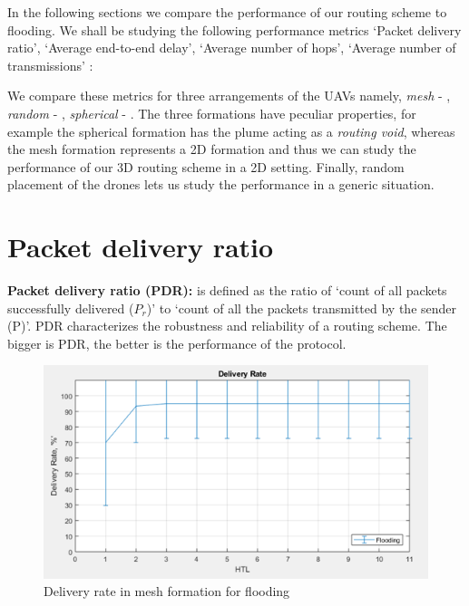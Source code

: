 In the following sections we compare the performance of our routing scheme to flooding. We shall be studying the following performance metrics `Packet delivery ratio', `Average end-to-end delay', `Average number of hops', `Average number of transmissions' \cite{OUBBATI201729}:

We compare these metrics for three arrangements of the UAVs namely, \emph{mesh} - , \emph{random} - , \emph{spherical} - . The three formations have peculiar properties, for example the spherical formation has the plume acting as a \emph{routing void}, whereas the mesh formation represents a 2D formation and thus we can study the performance of our 3D routing scheme in a 2D setting. Finally, random placement of the drones lets us study the performance in a generic situation.

\section{Packet delivery ratio}
\label{pdr}
    \textbf{Packet delivery ratio (PDR):} is defined as the ratio of `count of all packets successfully delivered ($P_r$)' to `count of all the packets transmitted by the sender (P)'. PDR characterizes the robustness and reliability of a routing scheme. The bigger is PDR, the better is the performance of the protocol. 
\begin{figure}[hbtp]
\centering
\includegraphics[width=1\textwidth]{ncsuthesis-0.6/Chapter-5/figs/fl_DR_mesh.png}
\caption{Delivery rate in mesh formation for flooding}
\label{fig:fl_DR_mesh}
\end{figure}

